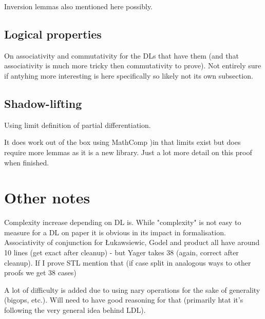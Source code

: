 \documentclass[a4paper,10pt]{article}
\begin{document}
Inversion lemmas also mentioned here possibly.

\subsection{Logical properties}

On associativity and commutativity for the DLs that have them (and that associativity is much more tricky then commutativity to prove). Not entirely sure if antyhing more interesting is here specifically so likely not its own subsection.

\subsection{Shadow-lifting}

Using limit definition of partial differentiation.

It does work out of the box using MathComp )in that limits exist but does require more lemmas as it is a new library.
Just a lot more detail on this proof when finished.


\section{Other notes}

Complexity increase depending on DL is. While "complexity" is not easy to measure for a DL on paper it is obvious in its impact in formalisation. Associativity of conjunction for Łukawsiewic, Godel and product all have around 10 lines (get exact after cleanup) - but Yager takes 38 (again, correct after cleanup). If I prove STL mention that (if case split in analogous ways to other proofs we get 38 cases)

A lot of difficulty is added due to using nary operations for the sake of generality (bigops, etc.). Will need to have good reasoning for that (primarily htat it's following the very general idea behind LDL).



\end{document}
